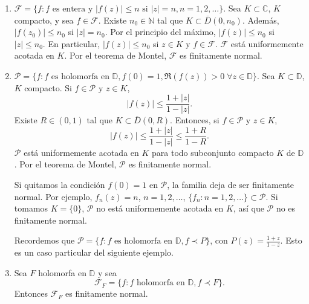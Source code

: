 \begin{example}
    \hfill
    \begin{enumerate}
        \item $\mathcal{F} = \{f : f \text{ es entera y } |f(z)| \leq n \text{ si } |z| = n, n = 1, 2, \dots\}$.
              Sea $K \subset \mathbb{C}$, $K$ compacto, y sea $f \in \mathcal{F}$.
              Existe $n_0 \in \mathbb{N}$ tal que $K \subset \overline{D}(0, n_0)$.
              Además, $|f(z_0)| \leq n_0$ si $|z| = n_0$.
              Por el principio del máximo, $|f(z)| \leq n_0$ si $|z| \leq n_0$.
              En particular, $|f(z)| \leq n_0$ si $z \in K$ y $f \in \mathcal{F}$.
              $\mathcal{F}$ está uniformemente acotada en $K$.
              Por el teorema de Montel, $\mathcal{F}$ es finitamente normal.

        \item $\mathcal{P} = \{f : f \text{ es holomorfa en } \mathbb{D}, f(0) = 1, \Re(f(z)) > 0 \; \forall z \in \mathbb{D}\}$.
              Sea $K \subset \mathbb{D}$, $K$ compacto.
              Si $f \in \mathcal{P}$ y $z \in K$,
              $$|f(z)| \leq \frac{1+|z|}{1-|z|}.$$
              Existe $R \in (0, 1)$ tal que $K \subset \overline{D}(0, R)$.
              Entonces, si $f \in \mathcal{P}$ y $z \in K$,
              $$|f(z)| \leq \frac{1+|z|}{1-|z|} \leq \frac{1+R}{1-R}.$$
              $\mathcal{P}$ está uniformemente acotada en $K$ para todo subconjunto compacto $K$ de $\mathbb{D}$.
              Por el teorema de Montel, $\mathcal{P}$ es finitamente normal.

              \begin{remark}
                  Si quitamos la condición $f(0) = 1$ en $\mathcal{P}$, la familia deja de ser finitamente normal.
                  Por ejemplo, $f_n(z) = n$, $n = 1, 2, \dots$, $\{f_n : n = 1, 2, \dots\} \subset \mathcal{P}$.
                  Si tomamos $K = \{0\}$, $\mathcal{P}$ no está uniformemente acotada en $K$, así que $\mathcal{P}$ no es finitamente normal.
              \end{remark}

              Recordemos que $\mathcal{P} = \{f : f \text{ es holomorfa en } \mathbb{D}, f \prec P\}$, con $P(z) = \frac{1+z}{1-z}$.
              Esto es un caso particular del siguiente ejemplo.

        \item Sea $F$ holomorfa en $\mathbb{D}$ y sea
              $$\mathcal{F}_F = \{f : f \text{ holomorfa en } \mathbb{D}, f \prec F\}.$$
              Entonces $\mathcal{F}_F$ es finitamente normal.


\end{enumerate}
\end{example}
